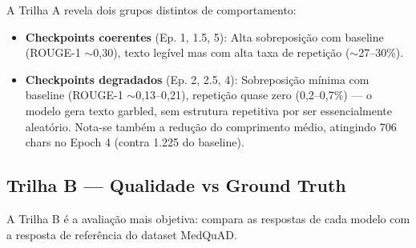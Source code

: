 A Trilha A revela dois grupos distintos de comportamento:

\begin{itemize}
    \item \textbf{Checkpoints coerentes} (Ep. 1, 1.5, 5): Alta sobreposição com baseline (ROUGE-1 $\sim$0,30), texto legível mas com alta taxa de repetição ($\sim$27--30\%).
    \item \textbf{Checkpoints degradados} (Ep. 2, 2.5, 4): Sobreposição mínima com baseline (ROUGE-1 $\sim$0,13--0,21), repetição quase zero (0,2--0,7\%) --- o modelo gera texto garbled, sem estrutura repetitiva por ser essencialmente aleatório. Nota-se também a redução do comprimento médio, atingindo 706 chars no Epoch 4 (contra 1.225 do baseline).
\end{itemize}

\subsection{Trilha B --- Qualidade vs Ground Truth}

A Trilha B é a avaliação mais objetiva: compara as respostas de cada modelo com a resposta de referência do dataset MedQuAD.

\begin{table}[H]
\centering
\caption{Trilha B --- Métricas vs ground truth (50 amostras de validação MedQuAD)}
\label{tab:trilha-b}
\end{table}

